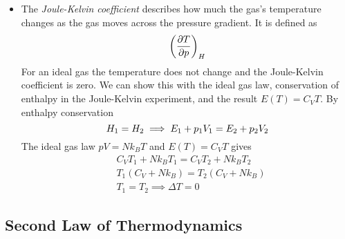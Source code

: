 \documentclass[11pt, a4paper]{article}
\newcommand{\pdveval}[3]{\left(\pdv{#1}{#2}\right)_{#3}}
\begin{document}
\begin{itemize}
	\item The \textit{Joule-Kelvin coefficient} describes how much the gas's temperature changes as the gas moves across the pressure gradient. It is defined as
	\begin{equation*}
		\pdveval{T}{p}{H}
	\end{equation*}
	For an ideal gas the temperature does not change and the Joule-Kelvin coefficient is zero. We can show this with the ideal gas law, conservation of enthalpy in the Joule-Kelvin experiment, and the result $ E(T) = C_{V}T $. By enthalpy conservation
	\begin{equation*}
		H_{1} = H_{2} \implies E_{1} + p_{1}V_{1} = E_{2} + p_{2}V_{2}\\
	\end{equation*}
	The ideal gas law $ pV = Nk_{B}T $ and $ E(T) = C_{V}T $ gives
	\begin{align*}
		&C_{V}T_{1} + Nk_{B}T_{1} = C_{V}T_{2} + Nk_{B}T_{2}\\
		&T_{1}(C_{V} + Nk_{B}) = T_{2}(C_{V} + Nk_{B})\\
		&T_{1} = T_{2} \implies \Delta T = 0
	\end{align*} 
\end{itemize}


\subsection{Second Law of Thermodynamics}
\end{document}
